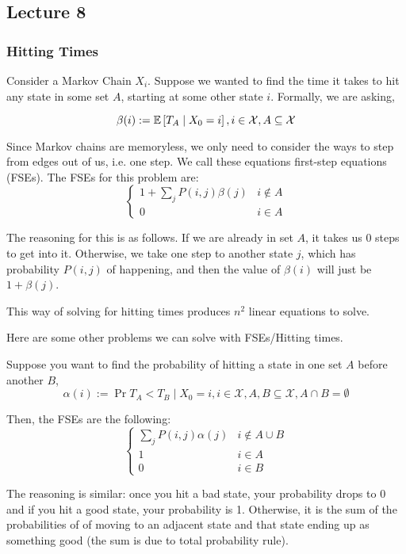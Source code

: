 \subsection{Lecture 8}

\subsubsection{Hitting Times}

\begin{note}
Consider a Markov Chain $X_i$. Suppose we wanted to find
the time it takes to hit any state in some set $A$, starting at some other state $i$.
Formally, we are asking,

\[ \beta(i) := \mathbb{E}\left[ T_A \mid X_0 = i \right], i \in \mathcal{X}, A \subseteq \mathcal{X} \]

Since Markov chains are memoryless, we only need to consider the ways to step from
edges out of us, i.e. one step. We call these equations first-step equations (FSEs).
The FSEs for this problem are:
\[
\begin{cases}
    1 + \sum_j P(i, j) \beta(j) & i \notin A \\
    0 & i \in A
\end{cases}
\]

The reasoning for this is as follows. If we are already in set $A$,
it takes us 0 steps to get into it. Otherwise, we take one step to another state $j$,
which has probability $P(i, j)$ of happening, and then the value of $\beta(i)$ will just be $1 + \beta(j)$.
\end{note}

This way of solving for hitting times produces $n^2$ linear equations to solve.

Here are some other problems we can solve with FSEs/Hitting times.

\begin{note}
Suppose you want to find the probability of hitting a state in one set $A$ before another $B$,
\[ \alpha(i) := \Pr{T_A < T_B \mid X_0 = i}, i \in \mathcal{X}, A,B \subseteq \mathcal{X}, A \cap B = \emptyset \]

Then, the FSEs are the following:
\[ 
    \begin{cases}
        \sum_j P(i, j) \alpha(j) & i \notin A \cup B \\
        1 & i \in A \\
        0 & i \in B
    \end{cases}
\]

The reasoning is similar: once you hit a bad state, your probability drops to 0 and
if you hit a good state, your probability is 1. Otherwise, it is the sum of the probabilities of
of moving to an adjacent state and that state ending up as something good (the sum is due to total probability rule).
\end{note}

